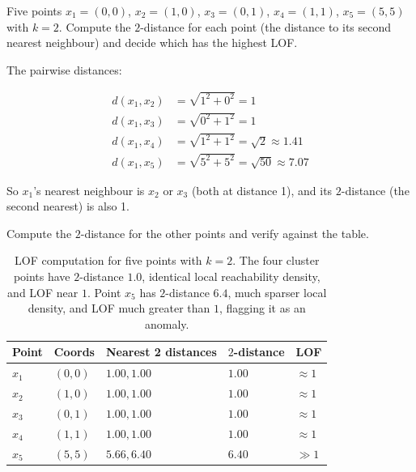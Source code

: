 \vspace{2.5em}

Five points $x_1{=}(0,0)$, $x_2{=}(1,0)$, $x_3{=}(0,1)$, $x_4{=}(1,1)$, $x_5{=}(5,5)$ with $k{=}2$.
Compute the $2$-distance for each point (the distance to its second nearest neighbour) and decide which has the highest LOF.

The pairwise distances:

\begin{align*}
    d(x_1, x_2) &= \sqrt{1^2 + 0^2} = 1 \\
    d(x_1, x_3) &= \sqrt{0^2 + 1^2} = 1 \\
    d(x_1, x_4) &= \sqrt{1^2 + 1^2} = \sqrt{2} \approx 1.41 \\
    d(x_1, x_5) &= \sqrt{5^2 + 5^2} = \sqrt{50} \approx 7.07
\end{align*}

So $x_1$'s nearest neighbour is $x_2$ or $x_3$ (both at distance 1), and its $2$-distance (the second nearest) is also 1.

Compute the $2$-distance for the other points and verify against the table.

\begin{table}[ht]
\centering
\begin{tabular}{p{}p{}p{}p{}p{}}
    \toprule
    \textbf{Point} & \textbf{Coords} & \textbf{Nearest 2 distances} & \textbf{$2$-distance} & \textbf{LOF} \\
    \midrule
    $x_1$ & $(0,0)$ & $1.00, 1.00$ & $1.00$ & $\approx 1$ \\
    $x_2$ & $(1,0)$ & $1.00, 1.00$ & $1.00$ & $\approx 1$ \\
    $x_3$ & $(0,1)$ & $1.00, 1.00$ & $1.00$ & $\approx 1$ \\
    $x_4$ & $(1,1)$ & $1.00, 1.00$ & $1.00$ & $\approx 1$ \\
    $x_5$ & $(5,5)$ & $5.66, 6.40$ & $6.40$ & $\gg 1$ \\
    \bottomrule
\end{tabular}
\vspace{2em}
\caption{LOF computation for five points with $k{=}2$. The four cluster points have $2$-distance $1.0$, identical local reachability density, and LOF near $1$. Point $x_5$ has $2$-distance $6.4$, much sparser local density, and LOF much greater than $1$, flagging it as an anomaly.}
\label{tab:lof_trace}
\end{table}

